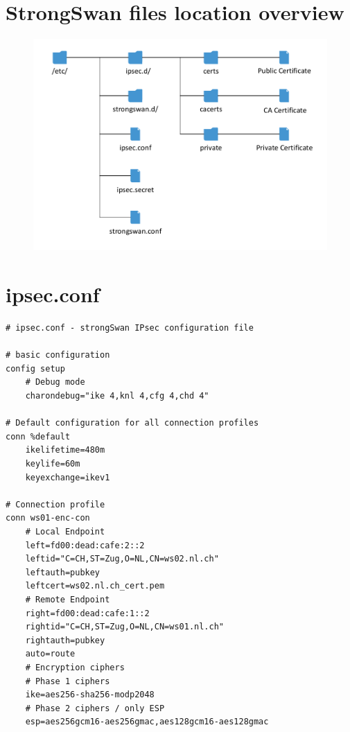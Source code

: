 \documentclass[a4paper]{report}
\begin{document}
\section{StrongSwan files location overview}
\begin{figure}[h!]
	\label{fig:StrongSwanFiles}
	\includegraphics[keepaspectratio,width=\textwidth]{StrongSwan_Files.pdf}
\end{figure}

\newpage

\section{ipsec.conf}
\label{app-sec:ipsec.conf-P2P}
\begin{lstlisting}
# ipsec.conf - strongSwan IPsec configuration file

# basic configuration
config setup
    # Debug mode
    charondebug="ike 4,knl 4,cfg 4,chd 4"

# Default configuration for all connection profiles
conn %default
    ikelifetime=480m
    keylife=60m
    keyexchange=ikev1

# Connection profile
conn ws01-enc-con
    # Local Endpoint
    left=fd00:dead:cafe:2::2
    leftid="C=CH,ST=Zug,O=NL,CN=ws02.nl.ch"
    leftauth=pubkey
    leftcert=ws02.nl.ch_cert.pem
    # Remote Endpoint
    right=fd00:dead:cafe:1::2
    rightid="C=CH,ST=Zug,O=NL,CN=ws01.nl.ch"
    rightauth=pubkey
    auto=route
    # Encryption ciphers
    # Phase 1 ciphers
    ike=aes256-sha256-modp2048
    # Phase 2 ciphers / only ESP
    esp=aes256gcm16-aes256gmac,aes128gcm16-aes128gmac
\end{lstlisting}
\end{document}
